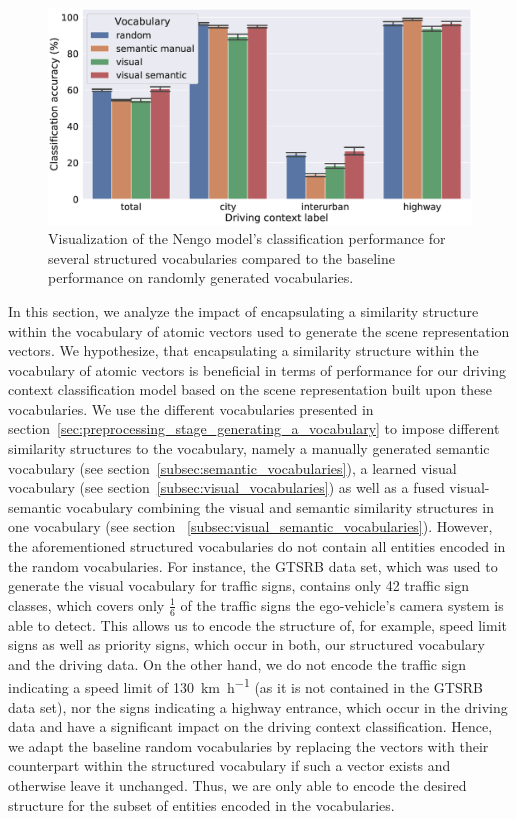 \begin{figure}[t]
    \centering
    \includegraphics[width=1.\linewidth]{imgs/context_class_vocabularies_tp_and_ts.eps}
    \caption{Visualization of the \ac{Nengo} model's classification performance for several structured vocabularies compared to the baseline performance on randomly generated vocabularies.}
    \label{fig:context_class_vocabularies_tp_and_ts}
\end{figure}

In this section, we analyze the impact of encapsulating a similarity structure within the vocabulary of atomic vectors used to generate the scene representation vectors.
We hypothesize, that encapsulating a similarity structure within the vocabulary of atomic vectors is beneficial in terms of performance for our driving context classification model based on the scene representation built upon these vocabularies.
We use the different vocabularies presented in section~\ref{sec:preprocessing_stage_generating_a_vocabulary} to impose different similarity structures to the vocabulary, namely a manually generated semantic vocabulary (see section~\ref{subsec:semantic_vocabularies}), a learned visual vocabulary (see section~\ref{subsec:visual_vocabularies}) as well as a fused visual-semantic vocabulary combining the visual and semantic similarity structures in one vocabulary (see section
~\ref{subsec:visual_semantic_vocabularies}).
However, the aforementioned structured vocabularies do not contain all entities encoded in the random vocabularies.
For instance, the \ac{GTSRB} data set, which was used to generate the visual vocabulary for traffic signs, contains only \num{42} traffic sign classes, which covers only $\frac{1}{6}$ of the traffic signs the ego-vehicle's camera system is able to detect.
This allows us to encode the structure of, for example, speed limit signs as well as priority signs, which occur in both, our structured vocabulary and the driving data.
On the other hand, we do not encode the traffic sign indicating a speed limit of \SI[per-mode=symbol]{130}{\kilo\meter\per\hour} (as it is not contained in the \ac{GTSRB} data set), nor the signs indicating a highway entrance, which occur in the driving data and have a significant impact on the driving context classification.
Hence, we adapt the baseline random vocabularies by replacing the vectors with their counterpart within the structured vocabulary if such a vector exists and otherwise leave it unchanged.
Thus, we are only able to encode the desired structure for the subset of entities encoded in the vocabularies.

